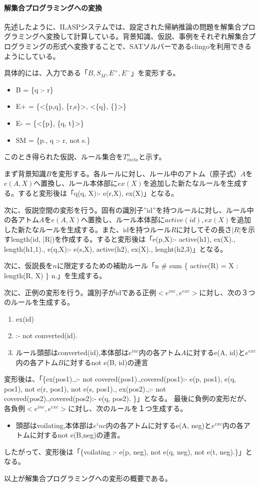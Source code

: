 \documentclass[dvipdfmx]{jsarticle}
\begin{document}
\paragraph{解集合プログラミングへの変換}
先述したように、ILASPシステムでは、設定された帰納推論の問題を解集合プログラミングへ変換して計算している。背景知識、仮説、事例をそれぞれ解集合プログラミングの形式へ変換することで、SATソルバーであるclingoを利用できるようにしている。\par
具体的には、入力である「$B, S_M, E^+, E^-$」を変形する。
\begin{itemize}
  \item B = \{q :- r\}
  \item E+ = \{<\{p,q\}, \{r,s\}>, <\{q\}, \{\}>\}
  \item E- = \{<\{p\}, \{q, t\}>\}
  \item SM = \{p., q :- r, not s.\}
\end{itemize}
このとき得られた仮説、ルール集合を$T^{n}_{meta}$と示す。\par
まず背景知識$B$を変形する。各ルールに対し、ルール中のアトム（原子式）$A$を$e(A, X)$へ置換し、ルール本体部に$ex(X)$を追加した新たなルールを生成する。すると変形後は「q(q, X):- e(r,X), ex(X)」となる。\par
次に、仮説空間の変形を行う。固有の識別子”id”を持つルールに対し、ルール中の各アトム$A$を$e(A, X)$へ置換し、ルール本体部に$active(id), ex(X)$を追加した新たなルールを生成する。また、idを持つルール$R$に対してその長さ$|R|$を示すlength(id, |R|)を作成する。すると変形後は「e(p,X):- active(h1), ex(X)., length(h1,1)., e(q,X):- e(s,X), active(h2), ex(X)., lenght(h2,3)」となる。\par
次に、仮説長を$n$に限定するための補助ルール「n \# sum \{ active(R) = X : length(R, X) \} n.」を生成する。\par
次に、正例の変形を行う。識別子がidである正例$<e^{inc}, e^{exc}>$に対し、次の３つのルールを生成する。
\begin{enumerate}
  \item ex(id)
  \item :- not converted(id).
  \item ルール頭部はconverted(id),本体部は$e^{inc}$内の各アトム$A$に対するe(A, id)と$e^{exc}$内の各アトム$B$に対するnot e(B, id)の連言
\end{enumerate}
変形後は、「\{ex(pos1).,:- not covered(pos1).,covered(pos1):- e(p, pos1), e(q, pos1), not e(r, pos1), not e(s, pos1)., ex(pos2).,:- not covered(pos2).,covered(pos2):- e(q, pos2). \}」となる。
最後に負例の変形だが、各負例$<e^{inc}, e^{exc}>$に対し、次のルールを１つ生成する。
\begin{itemize}
  \item 頭部はvoilating,本体部は$e^inc$内の各アトムに対するe(A, neg)と$e^{exc}$内の各アトムに対するnot e(B,neg)の連言。
\end{itemize}
したがって、変形後は「\{voilating :- e(p, neg), not e(q, neg), not e(t, neg).\}」となる。\par
以上が解集合プログラミングへの変形の概要である。
\end{document}
